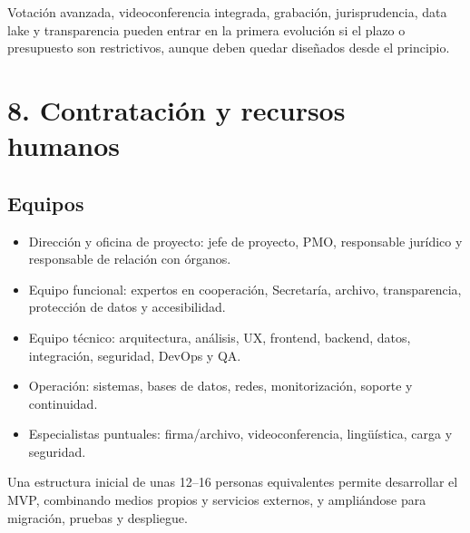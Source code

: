 \documentclass[11pt,a4paper]{article}
\begin{document}
Votación avanzada, videoconferencia integrada, grabación, jurisprudencia, data lake y transparencia pueden entrar en la primera evolución si el plazo o presupuesto son restrictivos, aunque deben quedar diseñados desde el principio.

\section{8. Contratación y recursos humanos}

\subsection{Equipos}
\begin{itemize}
\item Dirección y oficina de proyecto: jefe de proyecto, PMO, responsable jurídico y responsable de relación con órganos.
\item Equipo funcional: expertos en cooperación, Secretaría, archivo, transparencia, protección de datos y accesibilidad.
\item Equipo técnico: arquitectura, análisis, UX, frontend, backend, datos, integración, seguridad, DevOps y QA.
\item Operación: sistemas, bases de datos, redes, monitorización, soporte y continuidad.
\item Especialistas puntuales: firma/archivo, videoconferencia, lingüística, carga y seguridad.
\end{itemize}

Una estructura inicial de unas 12--16 personas equivalentes permite desarrollar el MVP, combinando medios propios y servicios externos, y ampliándose para migración, pruebas y despliegue.
\end{document}

